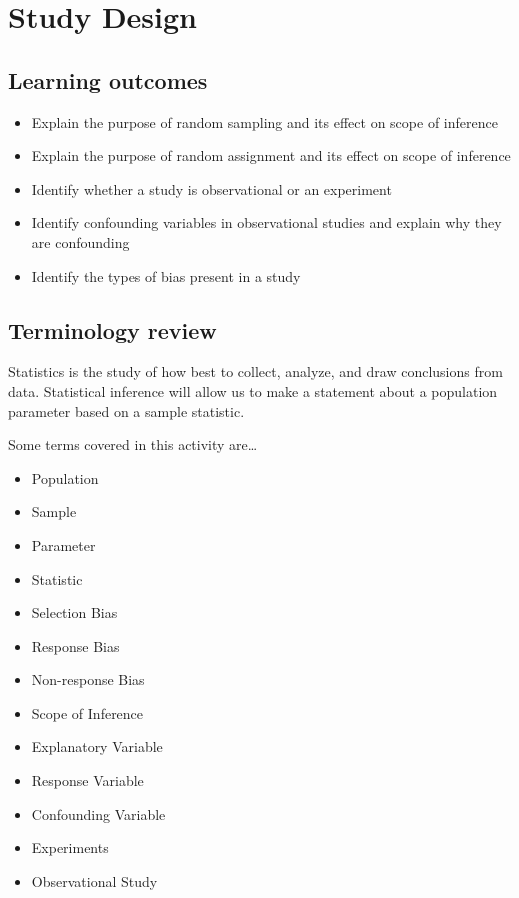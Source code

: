 \documentclass[
]{report}
\begin{document}
\hypertarget{study-design}{%
\chapter{Study Design}\label{study-design}}

\hypertarget{learning-outcomes}{%
\section{Learning outcomes}\label{learning-outcomes}}

\begin{itemize}
\item
  Explain the purpose of random sampling and its effect on scope of inference
\item
  Explain the purpose of random assignment and its effect on scope of inference
\item
  Identify whether a study is observational or an experiment
\item
  Identify confounding variables in observational studies and explain why they are confounding
\item
  Identify the types of bias present in a study
\end{itemize}

\hypertarget{terminology-review}{%
\section{Terminology review}\label{terminology-review}}

Statistics is the study of how best to collect, analyze, and draw conclusions from data. Statistical inference will allow us to make a statement about a population parameter based on a sample statistic.

Some terms covered in this activity are\ldots{}

\begin{itemize}
\item
  Population
\item
  Sample
\item
  Parameter
\item
  Statistic
\item
  Selection Bias
\item
  Response Bias
\item
  Non-response Bias
\item
  Scope of Inference
\item
  Explanatory Variable
\item
  Response Variable
\item
  Confounding Variable
\item
  Experiments
\item
  Observational Study
\end{itemize}
\end{document}
